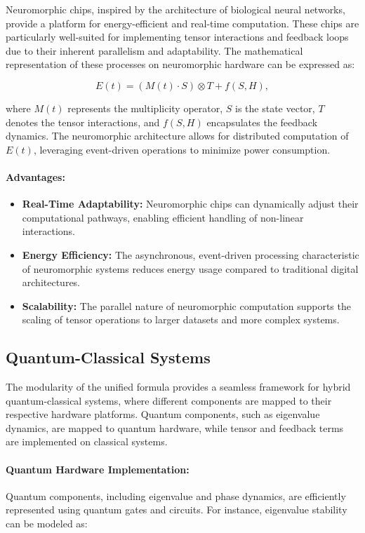 \documentclass{article}
\theoremstyle{plain}
\begin{document}
Neuromorphic chips, inspired by the architecture of biological neural networks, provide a platform for energy-efficient and real-time computation. These chips are particularly well-suited for implementing tensor interactions and feedback loops due to their inherent parallelism and adaptability. The mathematical representation of these processes on neuromorphic hardware can be expressed as:

\begin{equation}
E(t) = (M(t) \cdot S) \otimes T + f(S, H),
\end{equation}

where $M(t)$ represents the multiplicity operator, $S$ is the state vector, $T$ denotes the tensor interactions, and $f(S, H)$ encapsulates the feedback dynamics. The neuromorphic architecture allows for distributed computation of $E(t)$, leveraging event-driven operations to minimize power consumption.

\paragraph{Advantages:}
\begin{itemize}
    \item \textbf{Real-Time Adaptability:} Neuromorphic chips can dynamically adjust their computational pathways, enabling efficient handling of non-linear interactions.
    \item \textbf{Energy Efficiency:} The asynchronous, event-driven processing characteristic of neuromorphic systems reduces energy usage compared to traditional digital architectures.
    \item \textbf{Scalability:} The parallel nature of neuromorphic computation supports the scaling of tensor operations to larger datasets and more complex systems.
\end{itemize}

\subsection{Quantum-Classical Systems}

The modularity of the unified formula provides a seamless framework for hybrid quantum-classical systems, where different components are mapped to their respective hardware platforms. Quantum components, such as eigenvalue dynamics, are mapped to quantum hardware, while tensor and feedback terms are implemented on classical systems.

\paragraph{Quantum Hardware Implementation:}
Quantum components, including eigenvalue and phase dynamics, are efficiently represented using quantum gates and circuits. For instance, eigenvalue stability can be modeled as:
\end{document}
